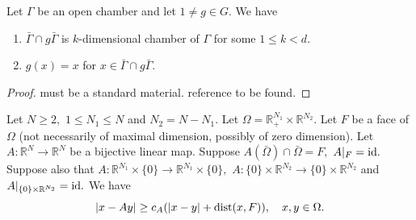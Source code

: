 \documentclass{amsart}
\begin{document}
\begin{lemma}\label{chamber properties} Let $\Gamma$ be an open chamber and let $1\neq g\in G.$ We have
\begin{enumerate}[{\rm (i)}]
\item $\bar{\Gamma}\cap g\bar{\Gamma}$ is $k$-dimensional chamber of $\Gamma$ for some $1\leq k<d.$ 
\item $g(x)=x$ for $x\in \bar{\Gamma}\cap g\bar{\Gamma}.$
\end{enumerate}
\end{lemma}
\begin{proof} {\color{red} must be a standard material. reference to be found.}
\end{proof}

\begin{lemma}\label{length comparison lemma} Let $N\geq 2,$ $1\leq N_1\leq N$ and $N_2=N-N_1.$ Let $\Omega=\mathbb{R}^{N_1}_+\times\mathbb{R}^{N_2}.$ Let $F$ be a face of $\Omega$ (not necessarily of maximal dimension, possibly of zero dimension). Let $A:\mathbb{R}^N\to\mathbb{R}^N$ be a bijective linear map. Suppose $A(\bar{\Omega})\cap\bar{\Omega}=F,$  $A|_F={\rm id}.$ Suppose also that $A:\mathbb{R}^{N_1}\times\{0\}\to\mathbb{R}^{N_1}\times\{0\},$  $A:\{0\}\times\mathbb{R}^{N_2}\to\{0\}\times\mathbb{R}^{N_2}$ and $A|_{\{0\}\times\mathbb{R}^{N_2}}={\rm id}.$ We have
$$|x-Ay|\geq c_A(|x-y|+{\rm dist}(x,F)),\quad x,y\in\Omega.$$
\end{lemma}
\end{document}
